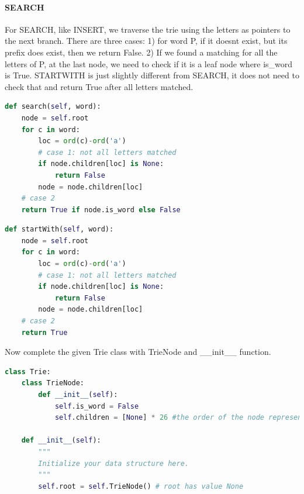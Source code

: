 \documentclass[data-structure.tex]{subfiles}
\begin{document}
\begin{examples}
\paragraph{SEARCH} For SEARCH, like INSERT, we traverse the trie using the letters as pointers to the next branch. There are three cases: 1) for word P, if it doesnt exist, but its prefix does exist, then we return False. 2) If we found a matching for all the letters of P, at the last node, we need to check if it is a leaf node where is\_word is True.  STARTWITH is just slightly different from SEARCH, it does not need to check that and return True after all letters matched. 
\begin{lstlisting}[language=Python]
def search(self, word):
    node = self.root
    for c in word:
        loc = ord(c)-ord('a')
        # case 1: not all letters matched 
        if node.children[loc] is None: 
            return False          
        node = node.children[loc]
    # case 2
    return True if node.is_word else False
\end{lstlisting}
\begin{lstlisting}[language=Python]
def startWith(self, word):
    node = self.root
    for c in word:
        loc = ord(c)-ord('a')
        # case 1: not all letters matched 
        if node.children[loc] is None: 
            return False          
        node = node.children[loc]
    # case 2
    return True
\end{lstlisting}
Now complete the given Trie class with TrieNode and \_\_init\_\_ function.
\begin{lstlisting}[language=Python]
class Trie:
    class TrieNode:
        def __init__(self):
            self.is_word = False
            self.children = [None] * 26 #the order of the node represents a char

    def __init__(self):
        """
        Initialize your data structure here.
        """
        self.root = self.TrieNode() # root has value None       
\end{lstlisting}
\end{examples}
\end{document}
